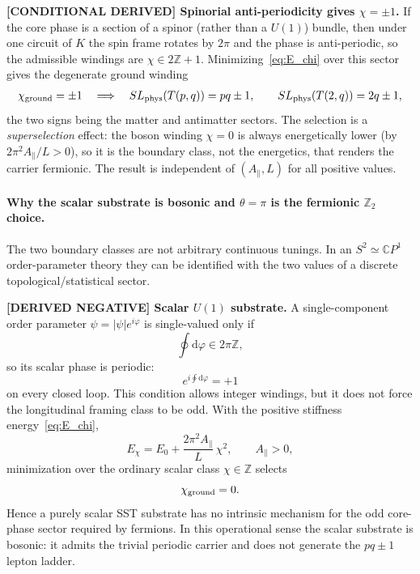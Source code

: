 \documentclass[11pt]{article}
\theoremstyle{definition}
\theoremstyle{plain}
\theoremstyle{remark}
\begin{document}
        \textbf{[CONDITIONAL DERIVED] Spinorial anti-periodicity gives $\chi=\pm1$.}
        If the core phase is a section of a spinor (rather than a $U(1)$) bundle, then under one
        circuit of $K$ the spin frame rotates by $2\pi$ and the phase is anti-periodic, so the
        admissible windings are $\chi\in 2\mathbb{Z}+1$. Minimizing~\eqref{eq:E_chi} over this
        sector gives the degenerate ground winding
        \begin{align}
            \chi_{\rm ground}=\pm1 \quad\Longrightarrow\quad
            SL_{\rm phys}(T(p,q))=pq\pm1,
            \qquad SL_{\rm phys}(T(2,q))=2q\pm1,
            \label{eq:SL_phys_pq1}
        \end{align}
        the two signs being the matter and antimatter sectors. The selection is a
        \emph{superselection} effect: the boson winding $\chi=0$ is always energetically lower
        (by $2\pi^2 A_\parallel/L>0$), so it is the boundary class, not the energetics, that
        renders the carrier fermionic. The result is independent of $(A_\parallel,L)$ for all
        positive values.

        \paragraph{Why the scalar substrate is bosonic and $\theta=\pi$ is the fermionic $\mathbb{Z}_2$ choice.}
        The two boundary classes are not arbitrary continuous tunings.  In an
        $S^2\simeq\mathbb{C}P^1$ order-parameter theory they can be identified with the two values
        of a discrete topological/statistical sector.

        \textbf{[DERIVED NEGATIVE] Scalar $U(1)$ substrate.}
        A single-component order parameter $\psi=|\psi|e^{i\varphi}$ is single-valued only if
        \begin{equation}
            \oint \mathrm{d}\varphi \in 2\pi\mathbb{Z},
        \end{equation}
        so its scalar phase is periodic:
        \begin{equation}
            e^{i\oint \mathrm{d}\varphi}=+1
        \end{equation}
        on every closed loop.  This condition allows integer windings, but it does not force
        the longitudinal framing class to be odd.  With the positive stiffness
        energy~\eqref{eq:E_chi},
        \begin{equation}
            E_\chi = E_0+\frac{2\pi^2 A_\parallel}{L}\,\chi^2,\qquad A_\parallel>0,
        \end{equation}
        minimization over the ordinary scalar class $\chi\in\mathbb{Z}$ selects
        \begin{equation}
            \chi_{\rm ground}=0 .
        \end{equation}
        Hence a purely scalar SST substrate has no intrinsic mechanism for the odd core-phase
        sector required by fermions.  In this operational sense the scalar substrate is bosonic:
        it admits the trivial periodic carrier and does not generate the $pq\pm1$ lepton ladder.
\end{document}
